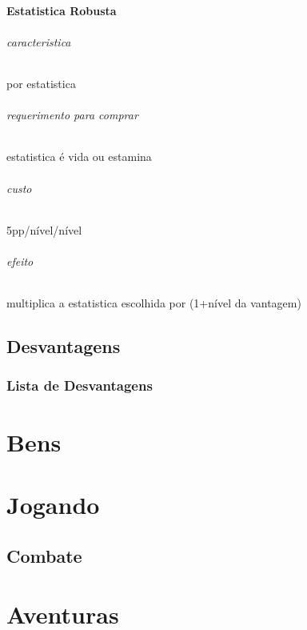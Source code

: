 \subsection{Estatistica Robusta}
\paragraph{caracteristica} por estatistica
\paragraph{requerimento para comprar} estatistica é vida ou estamina
\paragraph{custo} 5pp/nível/nível
\paragraph{efeito} multiplica a estatistica escolhida por (1+nível da vantagem)
%
%
%
%
\chapter{Desvantagens}
\section{Lista de Desvantagens}
%
%
%
%
%
%
%
\part{Bens}
%
%
%
%
\part{Jogando}
\chapter{Combate}
%
%
%
%
\part{Aventuras}
\chapter{}
